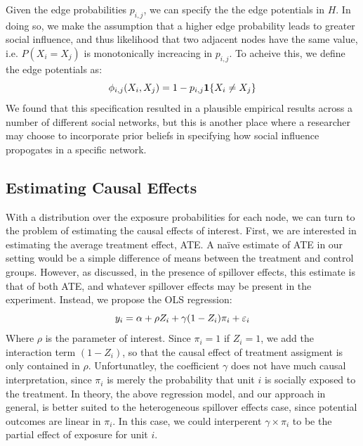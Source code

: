 \documentclass{article}
\begin{document}
Given the edge probabilities $p_{i,j}$, we can specify the the edge potentials in $H$. In doing so, 
we make the assumption that a higher edge probability leads to greater social influence, and thus likelihood that two adjacent nodes 
have the same value, i.e. $P(X_i = X_j)$ is monotonically increacing in $p_{i,j}$. To acheive this, we define the edge potentials as:
\begin{displaymath}
  \phi_{i,j}(X_i, X_j) = 1 - p_{i,j}\mathbf{1}\{{X_i \neq X_j}\} \\[0.5ex]
\end{displaymath}
We found that this specification resulted in a plausible empirical results across a number of different social networks, but this is another place where a researcher may choose to 
incorporate prior beliefs in specifying how social influence propogates in a specific network.

\subsection{Estimating Causal Effects}

With a distribution over the exposure probabilities for each node, we can turn to the problem of estimating the causal effects of interest. 
First, we are interested in estimating the average treatment effect, ATE. A naïve estimate of ATE in our setting would be a simple difference of means 
between the treatment and control groups. However, as discussed, in the presence of spillover effects, this estimate is that of both ATE, and whatever spillover 
effects may be present in the experiment. Instead, we propose the OLS regression: 
\begin{equation}
  y_i = \alpha + \rho Z_i + \gamma (1 - Z_i) \pi_i + \varepsilon_i \\[1.0ex]
\end{equation}
Where $\rho$ is the parameter of interest. Since $\pi_i = 1$ if $Z_i = 1$, we add the interaction term $(1 - Z_i)$, so that the causal effect of
treatment assigment is only contained in $\rho$. Unfortunatley, the coefficient $\gamma$ does not have much causal interpretation, since $\pi_i$ is merely the probability that unit $i$
is socially exposed to the treatment. In theory, the above regression model, and our approach in general, is better suited to the heterogeneous spillover effects case, since potential outcomes are linear in $\pi_i$. 
In this case, we could interperent $\gamma \times \pi_i$ to be the partial effect of exposure for unit $i$. 
\end{document}
